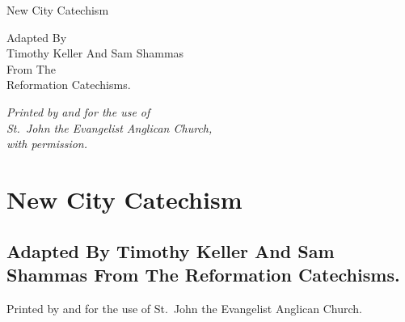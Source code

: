 \documentclass[00-main.tex]{subfiles}
\begin{document}



\pagestyle{empty}

\vfill

\begin{center}
	\begin{minipage}{2.9in}
	{\centering
	\Huge{New City Catechism}
	\par}
	\end{minipage}
\end{center}

\vfill

\begin{center}
	\begin{minipage}{2.9in}
	{\centering
	Adapted By\\
	Timothy Keller And Sam Shammas\\
	From The\\
	Reformation Catechisms.\par}
	\end{minipage}
\end{center}

\vfill

\begin{center}
	\begin{minipage}{2.9in}
	\begin{center}
	{\em Printed by and for the use of\\ St.\ John the Evangelist Anglican Church,\\ with permission.}
	\end{center}
	\end{minipage}
\end{center}

\vfill

\cleardoublepage

\pagestyle{plain}

\chapter*{New City Catechism}

\section*{Adapted By Timothy Keller And Sam Shammas From The Reformation Catechisms.}

Printed by and for the use of St.\ John the Evangelist Anglican Church.
\end{document}
